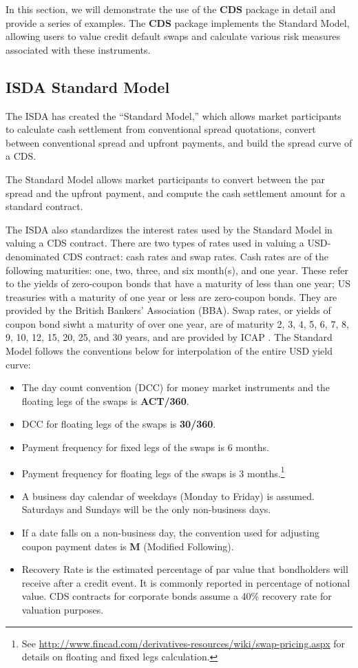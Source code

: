 \documentclass{jss}
\begin{document}
In this section, we will demonstrate the use of the \textbf{CDS} package in detail and provide a series of examples. The \textbf{CDS} package implements the Standard Model, allowing users to value credit default swaps and calculate various risk measures associated with these instruments. 

\subsection{ISDA Standard Model}
\label{sec:ISDAStMod}

The ISDA has created the ``Standard Model,'' which allows market participants to calculate cash settlement from conventional spread quotations, convert between conventional spread and upfront payments, and build the spread curve of a CDS. 

The Standard Model allows market participants to convert between the par spread and the upfront payment, and compute the cash settlement amount for a standard contract.

The ISDA also standardizes the interest rates used by the Standard Model in valuing a CDS contract. There are two types of rates used in valuing a USD-denominated CDS contract: cash rates and swap rates. Cash rates are of the following maturities: one, two, three, and six month(s), and one year. These refer to the yields of zero-coupon bonds that have a maturity of less than one year; US treasuries with a maturity of one year or less are zero-coupon bonds. They are provided by the British Bankers' Association (BBA). Swap rates, or yields of coupon bond siwht a maturity of over one year, are of maturity 2, 3, 4, 5, 6, 7, 8, 9, 10, 12, 15, 20, 25, and 30 years, and are provided by ICAP \citep{rates}. The Standard Model follows the conventions below for interpolation of the entire USD yield curve:
\begin{itemize}
\item The day count convention (DCC) for money market instruments and
  the floating legs of the swaps is \textbf{ACT/360}.
\item DCC for floating legs of the swaps is \textbf{30/360}.
\item Payment frequency for fixed legs of the swaps is 6 months.
\item Payment frequency for floating legs of the swaps is 3
  months.\footnote{See
    \url{http://www.fincad.com/derivatives-resources/wiki/swap-pricing.aspx}
    for details on floating and fixed legs calculation.}
\item A business day calendar of weekdays (Monday to Friday) is
  assumed. Saturdays and Sundays will be the only non-business days.
\item If a date falls on a non-business day, the convention used for
  adjusting coupon payment dates is \textbf{M} (Modified Following).
\item Recovery Rate is the estimated percentage of par value that
  bondholders will receive after a credit event. It is commonly
  reported in percentage of notional value. CDS contracts for corporate bonds
  assume a 40\% recovery rate for valuation purposes. 
\end{itemize}
\end{document}
